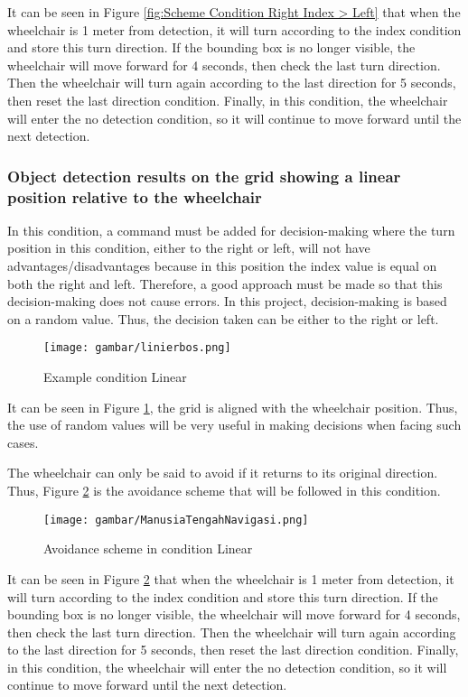 It can be seen in Figure \ref{fig:Scheme Condition Right Index > Left} that when the wheelchair is 1 meter from detection, it will turn according to the index condition and store this turn direction. If the bounding box is no longer visible, the wheelchair will move forward for 4 seconds, then check the last turn direction. Then the wheelchair will turn again according to the last direction for 5 seconds, then reset the last direction condition. Finally, in this condition, the wheelchair will enter the no detection condition, so it will continue to move forward until the next detection.

\subsubsection{Object detection results on the grid showing a linear position relative to the wheelchair}

In this condition, a command must be added for decision-making where the turn position in this condition, either to the right or left, will not have advantages/disadvantages because in this position the index value is equal on both the right and left. Therefore, a good approach must be made so that this decision-making does not cause errors. In this project, decision-making is based on a random value. Thus, the decision taken can be either to the right or left.

\begin{figure}[H]
    \centering
    \texttt{[image: gambar/linierbos.png]}
    \caption{Example condition Linear}
    \label{fig:Linear Condition}
\end{figure}

It can be seen in Figure \ref{fig:Linear Condition}, the grid is aligned with the wheelchair position. Thus, the use of random values will be very useful in making decisions when facing such cases.

The wheelchair can only be said to avoid if it returns to its original direction. Thus, Figure \ref{fig:Scheme Condition Linear} is the avoidance scheme that will be followed in this condition.

\begin{figure}[H]
  \centering
  \texttt{[image: gambar/ManusiaTengahNavigasi.png]}
  \caption{Avoidance scheme in condition Linear}
  \label{fig:Scheme Condition Linear}
\end{figure}

It can be seen in Figure \ref{fig:Scheme Condition Linear} that when the wheelchair is 1 meter from detection, it will turn according to the index condition and store this turn direction. If the bounding box is no longer visible, the wheelchair will move forward for 4 seconds, then check the last turn direction. Then the wheelchair will turn again according to the last direction for 5 seconds, then reset the last direction condition. Finally, in this condition, the wheelchair will enter the no detection condition, so it will continue to move forward until the next detection.
